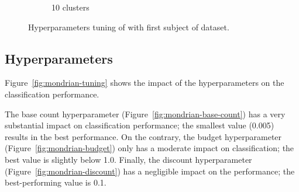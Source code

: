 \begin{figure}
\begin{subfigure}[b]{0.49\textwidth}
		 \caption{10 clusters}
	 \end{subfigure}
	\caption{Hyperparameters tuning of \mcnn with first subject of \banosdataset dataset. }
	\label{fig:mcnn-tuning-error}
\end{figure}

\subsection{\mondrianforest Hyperparameters}

Figure~\ref{fig:mondrian-tuning} shows the impact of the \mondrianforest hyperparameters on
the classification performance. 

The base count hyperparameter (Figure~\ref{fig:mondrian-base-count}) has a
very substantial impact on classification performance; the smallest value
(0.005) results in the best performance. On the contrary, the
budget hyperparameter (Figure~\ref{fig:mondrian-budget}) only has a
moderate impact on classification; the best value is slightly below
1.0. Finally, the discount hyperparameter
(Figure~\ref{fig:mondrian-discount}) has a negligible impact on the
performance; the best-performing value is 0.1.

